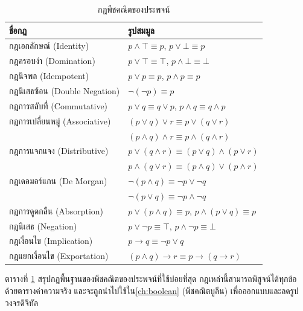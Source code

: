 \begin{table}[H]
    \centering
    \caption{กฎพีชคณิตของประพจน์}
    \label{tab:propositional-laws}
    \begin{tabular}{|l|l|}
        \hline
        \textbf{ชื่อกฎ} & \textbf{รูปสมมูล} \\ \hline
        กฎเอกลักษณ์ (Identity) & $p \land \top \equiv p$, \quad $p \lor \bot \equiv p$ \\ \hline
        กฎครอบงำ (Domination) & $p \lor \top \equiv \top$, \quad $p \land \bot \equiv \bot$ \\ \hline
        กฎนิจพล (Idempotent) & $p \lor p \equiv p$, \quad $p \land p \equiv p$ \\ \hline
        กฎนิเสธซ้อน (Double Negation) & $\neg(\neg p) \equiv p$ \\ \hline
        กฎการสลับที่ (Commutative) & $p \lor q \equiv q \lor p$, \quad $p \land q \equiv q \land p$ \\ \hline
        กฎการเปลี่ยนหมู่ (Associative) & $(p \lor q) \lor r \equiv p \lor (q \lor r)$ \\ \hline
                                     & $(p \land q) \land r \equiv p \land (q \land r)$ \\ \hline
        กฎการแจกแจง (Distributive) & $p \lor (q \land r) \equiv (p \lor q) \land (p \lor r)$ \\ \hline
                                & $p \land (q \lor r) \equiv (p \land q) \lor (p \land r)$ \\ \hline
        กฎเดอมอร์แกน (De Morgan) & $\neg(p \land q) \equiv \neg p \lor \neg q$ \\ \hline
                                 & $\neg(p \lor q) \equiv \neg p \land \neg q$ \\ \hline
        กฎการดูดกลืน (Absorption) & $p \lor (p \land q) \equiv p$, \quad $p \land (p \lor q) \equiv p$ \\ \hline
        กฎนิเสธ (Negation) & $p \lor \neg p \equiv \top$, \quad $p \land \neg p \equiv \bot$ \\ \hline
        กฎเงื่อนไข (Implication) & $p \rightarrow q \equiv \neg p \lor q$ \\ \hline
        กฎแยกเงื่อนไข (Exportation) & $(p \land q) \rightarrow r \equiv p \rightarrow (q \rightarrow r)$ \\ \hline
    \end{tabular}
\end{table}

ตารางที่ \ref{tab:propositional-laws} สรุปกฎพื้นฐานของพีชคณิตของประพจน์ที่ใช้บ่อยที่สุด กฎเหล่านี้สามารถพิสูจน์ได้ทุกข้อด้วยตารางค่าความจริง และจะถูกนำไปใช้ใน\autoref{ch:boolean} (พีชคณิตบูลีน) เพื่อออกแบบและลดรูปวงจรดิจิทัล

